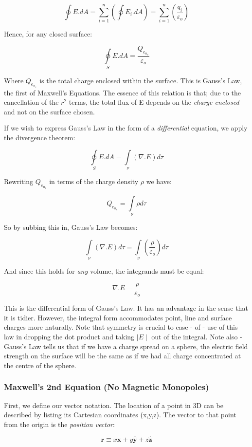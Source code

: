 \documentclass[a4paper,12pt]{article}
\begin{document}
\[\oint E.dA=\sum\limits_{i=1}^n(\oint E_i.dA)=\sum\limits_{i=1}^n(\frac{q_i}{\varepsilon_o})\]

Hence, for any closed surface:

\[\oint\limits_S E.dA=\frac{Q_e_n_c}{\varepsilon_o}\]

Where $Q_e_n_c$ is the total charge enclosed within the surface. This is Gauss's Law, the first of Maxwell's Equations. The essence of this relation is that; due to the cancellation of the $r^2$ terms, the total flux of E depends on the \emph{charge enclosed} and not on the surface chosen.

If we wish to express Gauss's Law in the form of a \emph{differential} equation, we apply the divergence theorem:

\[\oint\limits_S E.dA=\int\limits_\nu(\nabla.E)d\tau\]

Rewriting $Q_e_n_c$ in terms of the charge density $\rho$ we have:

\[Q_e_n_c=\int\limits_\nu \rho d\tau\]

So by subbing this in, Gauss's Law becomes:

\[\int\limits_\nu (\nabla.E)d\tau=\int\limits_\nu(\frac{\rho}{\varepsilon_o})d\tau\]

And since this holds for \emph{any} volume, the integrands must be equal:

\[\nabla.E=\frac{\rho}{\varepsilon_o}\]

This is the differential form of Gauss's Law. It has an advantage in the sense that it is tidier. However, the integral form accommodates point, line and surface charges more naturally. Note that symmetry is crucial to ease - of - use of this law in dropping the dot product and taking $\mid E \mid$ out of the integral. Note also - Gauss's Law tells us that if we have a charge spread on a sphere, the electric field strength on the surface will be the same as if we had all charge concentrated at the centre of the sphere.


\subsubsection{Maxwell's 2nd Equation (No Magnetic Monopoles)}

First, we define our vector notation. The location of a point in 3D can be described by listing its Cartesian coordinates (x,y,z). The vector to that point from the origin is the \emph{position vector}:

\[\textbf{r}\equiv x\mathbf{\hat{x}}+y\mathbf{\hat{y}}+z\mathbf{\hat{z}}\]
\end{document}
